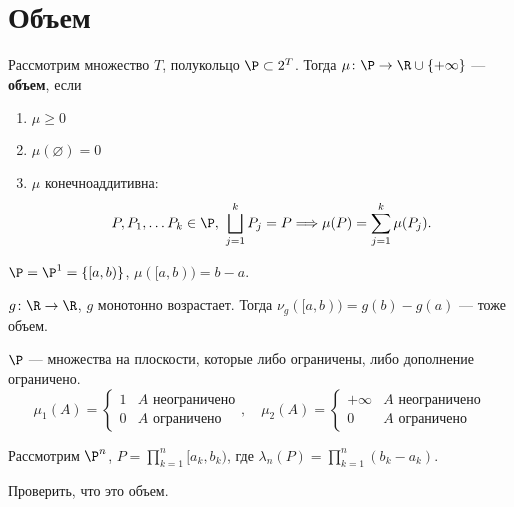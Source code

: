 \fontAwesomeSymbol{\faLinux}

\section{Объем}
\begin{defn}[Объем]
    Рассмотрим множество $ T$, полукольцо $ \P \subset 2^{T}$. Тогда $ \mu\colon \P \to \R \cup \{+\infty\}$ --- {\bf объем}, если
\begin{enumerate}[label=(\roman*),noitemsep]
    \item  $ \mu \ge 0$
	\item $ \mu(\varnothing) = 0$

	\item $ \mu$ конечноаддитивна:
		\[
			P, P_1, \ldots P_k \in \P, ~ \bigsqcup_{j=1}^{k}P_j = P \Longrightarrow \mu(P) = \sum_{j=1}^{k} \mu(P_j)
		.\] 
\end{enumerate} 
\end{defn}
\begin{ex}
	$ \P = \P^{1} = \{[a, b)\}$, $ \mu([a, b)) = b - a$.
\end{ex}
\begin{ex}
	$ g\colon \R \to \R$, $ g$ монотонно возрастает. Тогда  $ \nu_{g} ([a, b)) = g(b)-g(a)$ --- тоже объем.
\end{ex}
\begin{ex}
    $ \P$ --- множества на плоскости, которые либо ограничены, либо дополнение ограничено.
	\[
		\mu_1 (A) = 
		\begin{cases}
			1 & A  \text{ неограничено} \\
			0 & A  \text{ ограничено}
		\end{cases}
		, \quad
		\mu_2 (A) = 
		\begin{cases}
			+\infty & A  \text{ неограничено} \\
			0 & A  \text{ ограничено}
		\end{cases}
	\] 
\end{ex}
\begin{ex}
	Рассмотрим $ \P^{n}$, $ P = \prod\limits_{k=1}^{n} [a_k , b_k)$, где $ \lambda _{n}(P) = \prod_{k=1}^{n}(b_k - a_k)$.
	\begin{prac}
	    Проверить, что это объем.
	\end{prac}
\end{ex}

